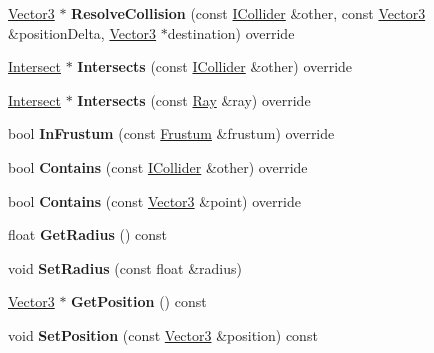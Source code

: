 \begin{DoxyCompactItemize}
\hyperlink{class_flounder_1_1_vector3}{Vector3} $\ast$ {\bfseries Resolve\+Collision} (const \hyperlink{class_flounder_1_1_i_collider}{I\+Collider} \&other, const \hyperlink{class_flounder_1_1_vector3}{Vector3} \&position\+Delta, \hyperlink{class_flounder_1_1_vector3}{Vector3} $\ast$destination) override
\item 
\mbox{\label{class_flounder_1_1_sphere_a6a1dddad92b188ec137d4e5c8b61c9dc}} 
\hyperlink{class_flounder_1_1_intersect}{Intersect} $\ast$ {\bfseries Intersects} (const \hyperlink{class_flounder_1_1_i_collider}{I\+Collider} \&other) override
\item 
\mbox{\label{class_flounder_1_1_sphere_ad6269a2a7d99b035c8e574efdcd3d724}} 
\hyperlink{class_flounder_1_1_intersect}{Intersect} $\ast$ {\bfseries Intersects} (const \hyperlink{class_flounder_1_1_ray}{Ray} \&ray) override
\item 
\mbox{\label{class_flounder_1_1_sphere_a8d8fdca3867cb9f7dfb85dc459772c1f}} 
bool {\bfseries In\+Frustum} (const \hyperlink{class_flounder_1_1_frustum}{Frustum} \&frustum) override
\item 
\mbox{\label{class_flounder_1_1_sphere_a3d5a912bb54dd4d0f5f4d485c30be9a2}} 
bool {\bfseries Contains} (const \hyperlink{class_flounder_1_1_i_collider}{I\+Collider} \&other) override
\item 
\mbox{\label{class_flounder_1_1_sphere_a18db07664af4e1234409c2c02e19c66a}} 
bool {\bfseries Contains} (const \hyperlink{class_flounder_1_1_vector3}{Vector3} \&point) override
\item 
\mbox{\label{class_flounder_1_1_sphere_acc87f45c88bfb6392abd9934f5377adf}} 
float {\bfseries Get\+Radius} () const
\item 
\mbox{\label{class_flounder_1_1_sphere_a26d59dbb688ed937961a84228122f63c}} 
void {\bfseries Set\+Radius} (const float \&radius)
\item 
\mbox{\label{class_flounder_1_1_sphere_a73e381532b17b081b8795446721dc036}} 
\hyperlink{class_flounder_1_1_vector3}{Vector3} $\ast$ {\bfseries Get\+Position} () const
\item 
\mbox{\label{class_flounder_1_1_sphere_a3ba632de238e357b2f0d7189daa86e96}} 
void {\bfseries Set\+Position} (const \hyperlink{class_flounder_1_1_vector3}{Vector3} \&position) const
\end{DoxyCompactItemize}
